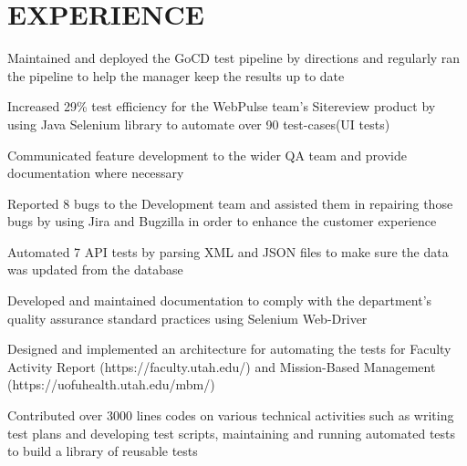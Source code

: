 \documentclass[]{deedy-resume-openfont}
\begin{document}
\begin{minipage}[t]{0.66\textwidth} 


\section{EXPERIENCE}

\vspace{\topsep} %
\begin{tightemize}\item Maintained and deployed the GoCD test pipeline by directions and regularly ran the pipeline to help the manager keep the results up to date
\item Increased 29\% test efficiency for the WebPulse team's Sitereview product by using Java Selenium library to
automate over 90 test-cases(UI tests)
\item Communicated feature development to the wider QA team and provide documentation where necessary
\item Reported 8 bugs to the Development team and assisted them in repairing those bugs by using Jira and Bugzilla in order to enhance the customer experience
\item Automated 7 API tests by parsing XML and JSON files to make sure the data was updated from the database
\end{tightemize}
\sectionsep

\begin{tightemize}
\item Developed and maintained documentation to comply with the department's quality assurance standard practices using Selenium Web-Driver
\item Designed and implemented an architecture for automating the tests for Faculty Activity Report (https://faculty.utah.edu/) and Mission-Based Management (https://uofuhealth.utah.edu/mbm/)
\item Contributed over 3000 lines codes on various technical activities such as writing test plans and developing test scripts, maintaining and running automated tests to build a library of reusable tests\end{tightemize}
\sectionsep


\end{minipage}
\end{document}
